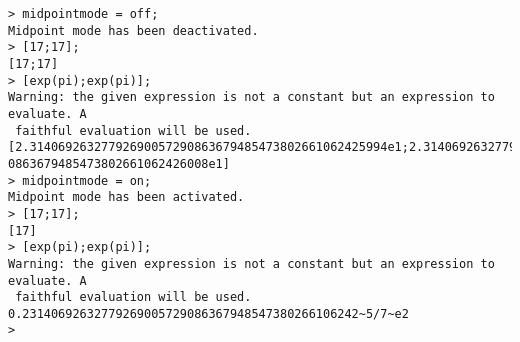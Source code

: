 \begin{center}\begin{minipage}{15cm}\begin{Verbatim}[frame=single]
> midpointmode = off;
Midpoint mode has been deactivated.
> [17;17];
[17;17]
> [exp(pi);exp(pi)];
Warning: the given expression is not a constant but an expression to evaluate. A
 faithful evaluation will be used.
[2.31406926327792690057290863679485473802661062425994e1;2.3140692632779269005729
0863679485473802661062426008e1]
> midpointmode = on;
Midpoint mode has been activated.
> [17;17];
[17]
> [exp(pi);exp(pi)];
Warning: the given expression is not a constant but an expression to evaluate. A
 faithful evaluation will be used.
0.23140692632779269005729086367948547380266106242~5/7~e2
> 
\end{Verbatim}
\end{minipage}\end{center}
